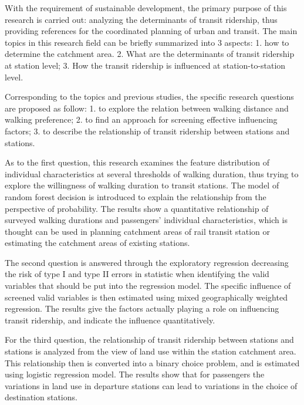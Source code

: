 \documentclass[12pt, twoside, a4paper]{book} %
\begin{document}
With the requirement of sustainable development, the primary purpose of this research is carried out: analyzing the determinants of transit ridership, thus providing references for the coordinated planning of urban and transit. The main topics in this research field can be briefly summarized into 3 aspects: 1. how to determine the catchment area. 2. What are the determinants of transit ridership at station level; 3. How the transit ridership is influenced at station-to-station level. 

Corresponding to the topics and previous studies, the specific research questions are proposed as follow: 1. to explore the relation between walking distance and walking preference; 2. to find an approach for screening effective influencing factors; 3. to describe the relationship of transit ridership between stations and stations.

As to the first question, this research examines the feature distribution of individual characteristics at several thresholds of walking duration, thus trying to explore the willingness of walking duration to transit stations. The model of random forest decision is introduced to explain the relationship from the perspective of probability. The results show a quantitative relationship of surveyed walking durations and passengers' individual characteristics, which is thought can be used in planning catchment areas of rail transit station or estimating the catchment areas of existing stations.

The second question is answered through the exploratory regression decreasing the risk of type I and type II errors in statistic when identifying the valid variables that should be put into the regression model. The specific influence of screened valid variables is then estimated using mixed geographically weighted regression. The results give the factors actually playing a role on influencing transit ridership, and indicate the influence quantitatively. 

For the third question, the relationship of transit ridership between stations and stations is analyzed from the view of land use within the station catchment area. This relationship then is converted into a binary choice problem, and is estimated using logistic regression model. The results show that for passengers the variations in land use in departure stations can lead to variations in the choice of destination stations.
\end{document}
